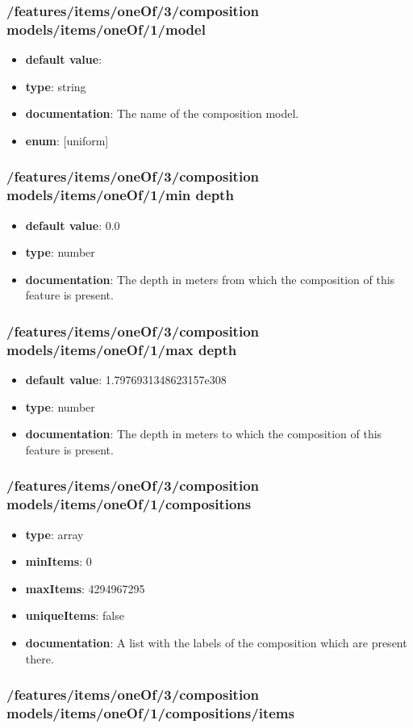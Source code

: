 \subsubsection{/features/items/oneOf/3/composition models/items/oneOf/1/model}
\begin{itemize}\item {\bf default value}: 
\item {\bf type}: string
\item {\bf documentation}: The name of the composition model.
\item {\bf enum}: [uniform]\end{itemize}\subsubsection{/features/items/oneOf/3/composition models/items/oneOf/1/min depth}
\begin{itemize}\item {\bf default value}: 0.0
\item {\bf type}: number
\item {\bf documentation}: The depth in meters from which the composition of this feature is present.
\end{itemize}\subsubsection{/features/items/oneOf/3/composition models/items/oneOf/1/max depth}
\begin{itemize}\item {\bf default value}: 1.7976931348623157e308
\item {\bf type}: number
\item {\bf documentation}: The depth in meters to which the composition of this feature is present.
\end{itemize}\subsubsection{/features/items/oneOf/3/composition models/items/oneOf/1/compositions}
\begin{itemize}\item {\bf type}: array
\item {\bf minItems}: 0
\item {\bf maxItems}: 4294967295
\item {\bf uniqueItems}: false
\item {\bf documentation}: A list with the labels of the composition which are present there.
\end{itemize}\subsubsection{/features/items/oneOf/3/composition models/items/oneOf/1/compositions/items}
